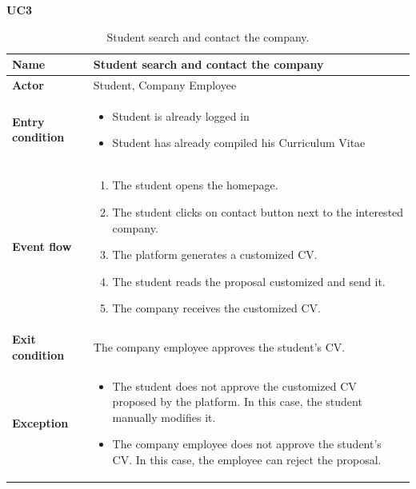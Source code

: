     \textbf{UC3}
    \nopagebreak
    \begin{table}[H]
    \centering
    \begin{tabular}{|l|p{11.9cm}|}
        \hline
        \textbf{Name}            & Student search and contact the company \\\hline
        \textbf{Actor}           & Student, Company Employee         \\\hline
        \textbf{Entry condition} &
        \begin{itemize}
              \item Student is already logged in
              \item Student has already compiled his Curriculum Vitae
        \end{itemize}                                        \\\hline
        \textbf{Event flow}      &
        \begin{enumerate}[label=\arabic*.]
              \item The student opens the homepage.
              \item The student clicks on contact button next to the interested company.
              \item The platform generates a customized CV.
              \item The student reads the proposal customized and send it.
              \item The company receives the customized CV.
        \end{enumerate}            \\\hline
        \textbf{Exit condition}  & The company employee approves the student's CV.\\\hline
        \textbf{Exception}       &  
        \begin{itemize}
              \item The student does not approve the customized CV proposed by the platform. In this case, the student manually modifies it.
              \item The company employee does not approve the student's CV. In this case, the employee can reject the proposal.  
        \end{itemize} 
        \\\hline
    \end{tabular}
    \caption{Student search and contact the company.}
    \label{table:Student search and contact the company}
    \end{table}

